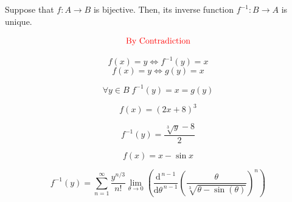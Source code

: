 %
%
%

\begin{frame}{}
  \begin{theorem}
    Suppose that $f: A \to B$ is bijective.
    Then, its inverse function $f^{-1}: B \to A$ is unique.
  \end{theorem}

  \pause
  \[
    \text{\textcolor{red}{By Contradiction}}
  \]

  \pause
  \[
    f(x) = y \iff f^{-1}(y) = x
  \]
  \[
    f(x) = y \iff g(y) = x
  \]

  \pause
  \[
    \forall y \in B\; f^{-1}(y) = x = g(y)
  \]
\end{frame}

\begin{frame}{}
  \[
    f(x) = (2x + 8)^{3}
  \]

  \pause
  \[
    f^{-1}(y) = \frac{\sqrt[3]{y} - 8}{2}
  \]

  \pause
  \vspace{0.50cm}
  \[
    f(x) = x - \sin x
  \]

  \pause
  \[
    f^{-1}(y) = \sum_{n=1}^\infty
      \frac{y^{n/3}}{n!} \lim_{ \theta \to 0}
      \left(\frac{\mathrm{d}^{\,n-1}}{\mathrm{d} \theta^{\,n-1}}
        \left(\frac \theta { \sqrt[3]{ \theta - \sin( \theta )} } \right)^n
      \right)
  \]
\end{frame}

